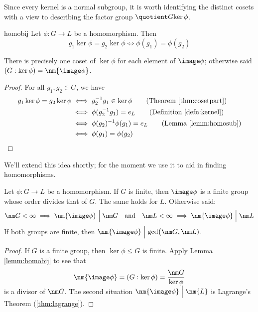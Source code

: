 Since every kernel is a normal subgroup, it is worth identifying the distinct cosets with a view to describing the factor group $\quotient G{\ker\phi}$.

\begin{lemm}{}{homobij}
	Let $\phi:G\to L$ be a homomorphism. Then
	\[
		g_1\ker\phi=g_2\ker\phi
		\iff \phi(g_1)=\phi(g_2)
	\]
\end{lemm}

There is precisely one coset of $\ker\phi$ for each element of $\image\phi$; otherwise said $(G:\ker\phi)=\nm{\image\phi}$.

\begin{proof}
	For all $g_1,g_2\in G$, we have
	\begin{align*}
		g_1\ker\phi=g_2\ker\phi&\iff g_2^{-1}g_1\in\ker\phi \tag{Theorem \ref{thm:cosetpart}}\\
		&\iff\phi(g_2^{-1}g_1)=e_L\tag{Definition \ref{defn:kernel}}\\
		&\iff \phi(g_2)^{-1}\phi(g_1)=e_L\tag{Lemma \ref{lemm:homosub}}\\
		&\iff \phi(g_1)=\phi(g_2)\tag*{\qedhere}
	\end{align*}
\end{proof}

We'll extend this idea shortly; for the moment we use it to aid in finding homomorphisms.

\begin{thm}{}{}
	Let $\phi:G\to L$ be a homomorphism. If $G$ is finite, then $\image\phi$ is a finite group whose order divides that of $G$. The same holds for $L$. Otherwise said:
	\[
		\nm G<\infty
		\implies\nm{\image\phi}\Bigm| \nm G
		\quad\text{and}\quad 
		\nm L<\infty\implies\nm{\image\phi}\Bigm| \nm L
	\]
	If both groups are finite, then $\smash[t]{\nm{\image\phi}\Bigm|\gcd\bigl(\nm G,\nm L)}$.
\end{thm}

\begin{proof}
	If $G$ is a finite group, then $\ker\phi\le G$ is finite. Apply Lemma \ref{lemm:homobij} to see that
	\[
		\nm{\image\phi}=(G:\ker\phi) =\smash[b]{\frac{\nm G}{\ker\phi}}
	\]
	is a divisor of $\nm G$. The second situation $\nm{\image\phi}\Bigm|\nm{L}$ is Lagrange's Theorem (\ref{thm:lagrange}).
\end{proof}


